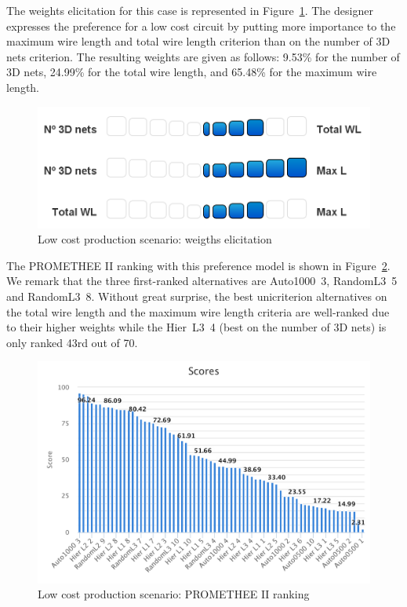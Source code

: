 \documentclass{svmult}
\begin{document}
The weights elicitation for this case is represented in Figure~\ref{fig:elicitcost}. The designer expresses the preference for a low cost circuit by putting more importance to the maximum wire length and total wire length criterion than on the number of 3D nets criterion. The resulting weights are given as follows: 9.53\% for the number of 3D nets, 24.99\% for the total wire length, and 65.48\% for the maximum wire length.

\begin{figure}[h!]
    \centering
    \includegraphics[width=0.6\linewidth]{elicitcost.png}
    \caption{Low cost production scenario: weigths elicitation}
    \label{fig:elicitcost}
\end{figure}

The PROMETHEE II ranking with this preference model is shown in Figure~\ref{fig:rankingcost}. We remark that the three first-ranked alternatives are Auto1000~3, RandomL3~5 and RandomL3~8. Without great surprise, the best unicriterion alternatives on the total wire length and the maximum wire length criteria are well-ranked due to their higher weights while the Hier~L3~4 (best on the number of 3D nets) is only ranked 43rd out of 70.

\begin{figure}[h!]
    \centering
    \includegraphics[width=\linewidth]{rankingcost}
    \caption{Low cost production scenario: PROMETHEE II ranking}
    \label{fig:rankingcost}
\end{figure}
\end{document}
